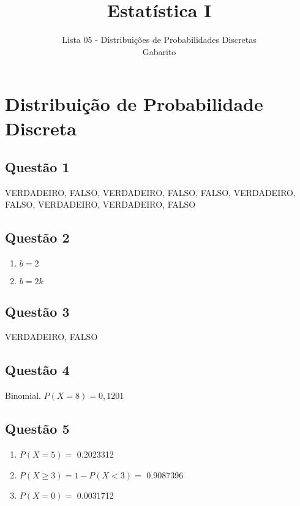 \documentclass[
]{article}
\title{Estatística I}
\subtitle{Lista 05 - Distribuições de Probabilidades Discretas\\
Gabarito}
\author{}
\date{\vspace{-2.5em}}
\begin{document}
\maketitle

\hypertarget{distribuiuxe7uxe3o-de-probabilidade-discreta}{%
\section{Distribuição de Probabilidade
Discreta}\label{distribuiuxe7uxe3o-de-probabilidade-discreta}}

\hypertarget{questuxe3o-1}{%
\subsection{Questão 1}\label{questuxe3o-1}}

VERDADEIRO, FALSO, VERDADEIRO, FALSO, FALSO, VERDADEIRO, FALSO,
VERDADEIRO, VERDADEIRO, FALSO

\hypertarget{questuxe3o-2}{%
\subsection{Questão 2}\label{questuxe3o-2}}

\begin{enumerate}
\def\labelenumi{\alph{enumi})}
\item
  \(b=2\)
\item
  \(b=2k\)
\end{enumerate}

\hypertarget{questuxe3o-3}{%
\subsection{Questão 3}\label{questuxe3o-3}}

VERDADEIRO, FALSO

\hypertarget{questuxe3o-4}{%
\subsection{Questão 4}\label{questuxe3o-4}}

Binomial. \(P(X=8)=0,1201\)

\hypertarget{questuxe3o-5}{%
\subsection{Questão 5}\label{questuxe3o-5}}

\begin{enumerate}
\def\labelenumi{\alph{enumi})}
\item
  \(P(X=5)=\) 0.2023312
\item
  \(P(X\geq 3) = 1-P(X<3)=\) 0.9087396
\item
  \(P(X=0)=\) 0.0031712
\end{enumerate}
\end{document}
